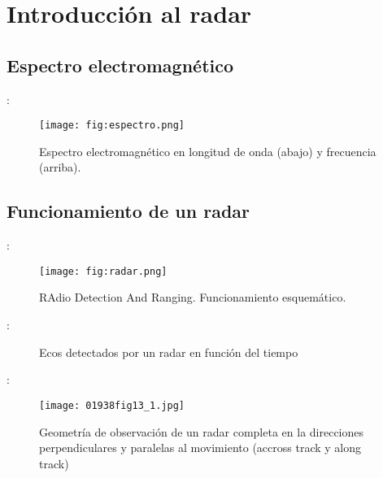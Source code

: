 \section{Introducción al radar}
\subsection{Espectro electromagnético}
\begin{frame}{\secname : \subsecname}
  \begin{figure}
    \centering
    \texttt{[image: fig:espectro.png]}
    \caption{Espectro electromagnético en longitud de onda (abajo) y frecuencia (arriba).}
    \label{}
  \end{figure}
\end{frame}

\subsection{Funcionamiento de un radar}
\begin{frame}{\secname : \subsecname}
    \begin{figure}
      \centering
      \texttt{[image: fig:radar.png]}
      \caption{RAdio Detection And Ranging. Funcionamiento esquemático.}
      \label{}
    \end{figure}
\end{frame}

\begin{frame}{\secname : \subsecname}
  \begin{figure}
    \centering
    \caption{Ecos detectados por un radar en función del tiempo}
    \label{}
  \end{figure}
\end{frame}

\begin{frame}{\secname : \subsecname}
  \begin{figure}
    \centering
    \texttt{[image: 01938fig13\_1.jpg]}
    \caption{Geometría de observación de un radar completa en la direcciones perpendiculares y paralelas al movimiento (accross track y along track)}
    \label{}
  \end{figure}
\end{frame}


